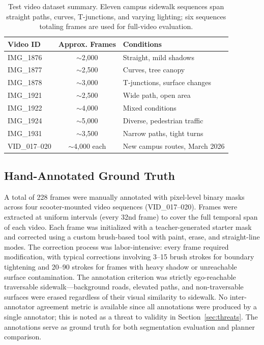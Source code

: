 \documentclass[12pt,letterpaper,oneside]{report}
\begin{document}
\begin{table}[h]
\centering
\caption{Test video dataset summary. Eleven campus sidewalk sequences span straight paths, curves, T-junctions, and varying lighting; six sequences totaling  frames are used for full-video evaluation.}
\label{tab:video_dataset}
\begin{tabular}{lcl}
\toprule
Video ID & Approx. Frames & Conditions \\
\midrule
IMG\_1876 & $\sim$2,000 & Straight, mild shadows \\
IMG\_1877 & $\sim$2,500 & Curves, tree canopy \\
IMG\_1878 & $\sim$3,000 & T-junctions, surface changes \\
IMG\_1921 & $\sim$2,500 & Wide path, open area \\
IMG\_1922 & $\sim$4,000 & Mixed conditions \\
IMG\_1924 & $\sim$5,000 & Diverse, pedestrian traffic \\
IMG\_1931 & $\sim$3,500 & Narrow paths, tight turns \\
VID\_017--020 & $\sim$4,000 each & New campus routes, March 2026 \\
\bottomrule
\end{tabular}
\end{table}


\subsection{Hand-Annotated Ground Truth}

A total of 228 frames were manually annotated with pixel-level binary masks across four scooter-mounted video sequences (VID\_017--020).  Frames were extracted at uniform intervals (every 32nd frame) to cover the full temporal span of each video.  Each frame was initialized with a teacher-generated starter mask and corrected using a custom brush-based tool with paint, erase, and straight-line modes.  The correction process was labor-intensive: every frame required modification, with typical corrections involving 3--15 brush strokes for boundary tightening and 20--90 strokes for frames with heavy shadow or unreachable surface contamination.  The annotation criterion was strictly ego-reachable traversable sidewalk---background roads, elevated paths, and non-traversable surfaces were erased regardless of their visual similarity to sidewalk.  No inter-annotator agreement metric is available since all annotations were produced by a single annotator; this is noted as a threat to validity in Section~\ref{sec:threats}.  The annotations serve as ground truth for both segmentation evaluation and planner comparison.
\end{document}
